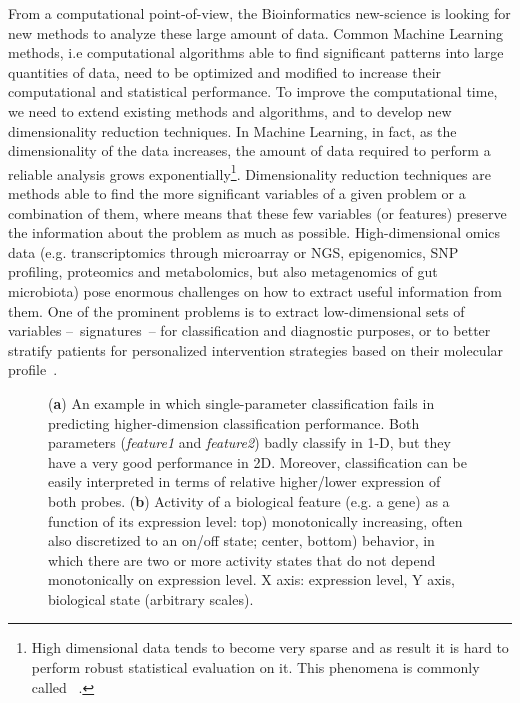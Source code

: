 \documentclass{standalone}
\begin{document}
From a computational point-of-view, the Bioinformatics new-science is looking for new methods to analyze these large amount of data.
Common Machine Learning methods, i.e computational algorithms able to find significant patterns into large quantities of data, need to be optimized and modified to increase their computational and statistical performance.
To improve the computational time, we need to extend existing methods and algorithms, and to develop new dimensionality reduction techniques.
In Machine Learning, in fact, as the dimensionality of the data increases, the amount of data required to perform a reliable analysis grows exponentially\footnote{
  High dimensional data tends to become very sparse and as result it is hard to perform robust statistical evaluation on it.
  This phenomena is commonly called ~\cite{bellman1961adaptive}.
}.
Dimensionality reduction techniques are methods able to find the more significant variables of a given problem or a combination of them, where  means that these few variables (or features) preserve the information about the problem as much as possible.
High-dimensional omics data (e.g. transcriptomics through microarray or NGS, epigenomics, SNP profiling, proteomics and metabolomics, but also metagenomics of gut microbiota) pose enormous challenges on how to extract useful information from them.
One of the prominent problems is to extract low-dimensional sets of variables –~signatures~– for classification and diagnostic purposes, or to better stratify patients for personalized intervention strategies based on their molecular profile~\cite{Scotlandi2009, Chan2011, Johnson2017, Beckmann2016ReconcilingEM}.


\begin{figure}[htbp]
\centering
\def\svgwidth{0.4\textwidth}

\qquad\qquad
\def\svgwidth{0.4\textwidth}

\caption{(\textbf{a}) An example in which single-parameter classification fails in predicting higher-dimension classification performance.
Both parameters (\emph{feature1} and \emph{feature2}) badly classify in 1-D, but they have a very good performance in 2D.
Moreover, classification can be easily interpreted in terms of relative higher/lower expression of both probes.
(\textbf{b}) Activity of a biological feature (e.g. a gene) as a function of its expression level:
top) monotonically increasing, often also discretized to an on/off state;
center, bottom)  behavior, in which there are two or more activity states that do not depend monotonically on expression level.
X axis: expression level, Y axis, biological state (arbitrary scales).
}
\label{fig:example}
\end{figure}
\end{document}
